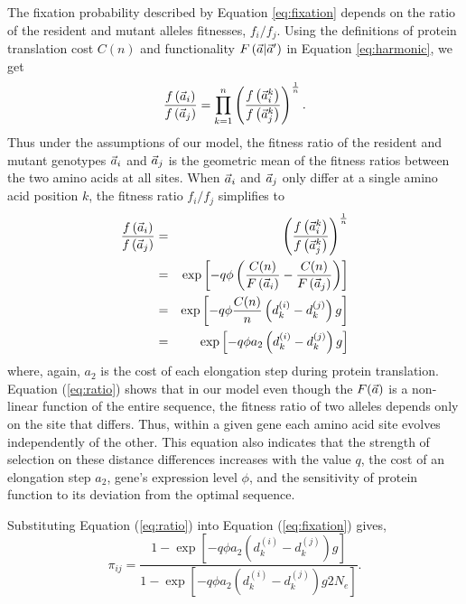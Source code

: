 The fixation probability described by Equation \ref{eq:fixation} depends on the ratio of the resident and mutant alleles fitnesses,  $f_i/f_j$.
Using the definitions of protein translation cost $C(n)$ and functionality $F\left(\vec{a}|\vec{a}^\prime\right)$ in Equation \ref{eq:harmonic}, we get
\begin{equation}
\frac{f\left(\vec{a}_i\right)}{f\left(\vec{a}_j\right)} = \prod_{k=1}^n\left( \frac{f\left(\vec{a}_i^k\right)}{f\left(\vec{a}_j^k\right)}\right)^{\frac{1}{n}}.
\end{equation}
Thus under the assumptions of our model, the fitness ratio of the resident and mutant genotypes $\vec{a}_i$ and $\vec{a}_j$ is the geometric mean of the fitness ratios between the two amino acids at all sites.
When $\vec{a}_i$ and $\vec{a}_j$ only differ at a single amino acid position $k$, the fitness ratio $f_i/f_j$ simplifies to  
\begin{eqnarray}
\frac{f\left(\vec{a}_i\right)}{f\left(\vec{a}_j\right)} & = & \left( \frac{f\left(\vec{a}_i^k\right)}{f\left(\vec{a}_j^k\right)}\right)^{\frac{1}{n}}\\
 & = &\exp \left[-q \phi \left( \frac{ C(n) }{F\left(\vec{a}_i \right)} - \frac{ C(n)}{F\left(\vec{a}_j \right)}\right)\right] \nonumber\\
& = & \exp\left[ - q \phi \frac{C(n)}{n}\left(d_k^{(i)} - d_k^{(j)}\right) g\right]\\
& = & \exp\left[ - q \phi a_2 \left(d_k^{(i)} - d_k^{(j)}\right) g\right] \label{eq:ratio}
\end{eqnarray}
where, again, $a_2$ is the cost of each elongation step during protein translation. 
Equation (\ref{eq:ratio}) shows that in our model even though the $F(\vec{a})$ is a non-linear function of the entire sequence,  the fitness ratio of two alleles depends only on the site that differs.
Thus,  within a given gene each amino acid site  evolves independently of the other.
This equation also indicates that the strength of selection on these distance differences increases with the value $q$, the cost of an elongation step $a_2$, gene's expression level $\phi$, and the sensitivity of protein function to its deviation from the optimal sequence.


Substituting Equation (\ref{eq:ratio}) into Equation (\ref{eq:fixation}) gives,
\begin{equation}
\pi_{ij} = \frac{1-\exp\left[ - q \phi a_2 \left(d_k^{(i)} - d_k^{(j)}\right) g\right]}{1-\exp\left[ - q \phi a_2 \left(d_k^{(i)} - d_k^{(j)}\right) g 2N_e\right]}.
\label{eq:fixationII}
\end{equation}

